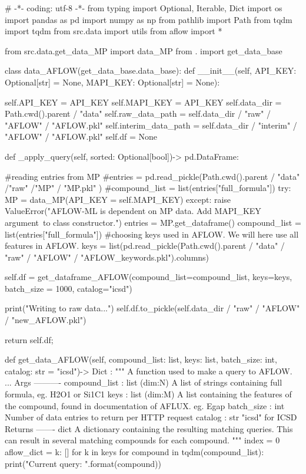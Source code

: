 # -*- coding: utf-8 -*-
from typing import Optional, Iterable, Dict
import os
import pandas as pd
import numpy as np
from pathlib import Path
from tqdm import tqdm
from src.data import utils
from aflow import *

from src.data.get_data_MP import data_MP
from . import get_data_base


class data_AFLOW(get_data_base.data_base):
    def __init__(self, API_KEY: Optional[str] = None, MAPI_KEY: Optional[str] = None):

        self.API_KEY = API_KEY
        self.MAPI_KEY = API_KEY
        self.data_dir = Path.cwd().parent / "data"
        self.raw_data_path = self.data_dir / "raw" / "AFLOW" / "AFLOW.pkl"
        self.interim_data_path = self.data_dir / "interim" / "AFLOW" / "AFLOW.pkl"
        self.df = None

    def _apply_query(self, sorted: Optional[bool])-> pd.DataFrame:

        #reading entries from MP
        #entries = pd.read_pickle(Path.cwd().parent / "data" /"raw" /"MP" / "MP.pkl" )
        #compound_list = list(entries["full_formula"])
        try:
            MP = data_MP(API_KEY = self.MAPI_KEY)
        except:
            raise ValueError("AFLOW-ML is dependent on MP data. Add MAPI_KEY argument\
            to class constructor.")
        entries = MP.get_dataframe()
        compound_list = list(entries["full_formula"])
        #choosing keys used in AFLOW. We will here use all features in AFLOW.
        keys = list(pd.read_pickle(Path.cwd().parent / "data" / "raw" / "AFLOW" / "AFLOW_keywords.pkl").columns)

        self.df = get_dataframe_AFLOW(compound_list=compound_list, keys=keys, batch_size = 1000, catalog="icsd")

        print("Writing to raw data...")
        self.df.to_pickle(self.data_dir / "raw"  / "AFLOW" / "new_AFLOW.pkl")

        return self.df;

    def get_data_AFLOW(self, compound_list: list, keys: list, batch_size: int, catalog: str = "icsd")-> Dict :
        """
        A function used to make a query to AFLOW.
        ...
        Args
        ----------
        compound_list : list (dim:N)
            A list of strings containing full formula, eg. H2O1 or Si1C1
        keys : list (dim:M)
            A list containing the features of the compound, found in documentation of AFLUX.
            eg. Egap
        batch_size : int
            Number of data entries to return per HTTP request
        catalog : str
            "icsd" for ICSD
        Returns
        -------
        dict
            A dictionary containing the resulting matching queries. This can result
            in several matching compounds for each compound.
        """
        index = 0
        aflow_dict = {k: [] for k in keys}
        for compound in tqdm(compound_list):
            print("Current query: {}".format(compound))

